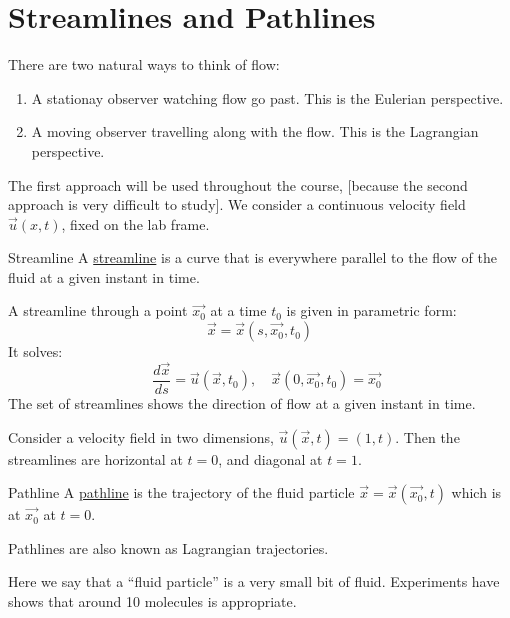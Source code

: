\documentclass[../Main.tex]{subfiles}
\begin{document}
\section{Streamlines and Pathlines}
There are two natural ways to think of flow:
\begin{enumerate}
    \item A stationay observer watching flow go past. This is the Eulerian perspective.
    \item A moving observer travelling along with the flow. This is the Lagrangian perspective.
\end{enumerate}
The first approach will be used throughout the course, [because the second approach is very difficult to study]. We consider a continuous velocity field $\vec{u}(x, t)$, fixed on the lab frame.
\begin{definition}{Streamline}
    A \underline{streamline} is a curve that is everywhere parallel to the flow of the fluid at a given instant in time.
\end{definition}
A streamline through a point $\vec{x_0}$ at a time $t_0$ is given in parametric form:
\begin{equation*}
    \vec{x} = \vec{x}(s, \vec{x_0}, t_0)
\end{equation*}
It solves:
\begin{equation*}
    \quad\frac{d\vec{x}}{ds} = \vec{u}(\vec{x}, t_0),\quad \vec{x}(0, \vec{x_0}, t_0) = \vec{x_0}
\end{equation*}
The set of streamlines shows the direction of flow at a given instant in time.
\begin{example}
    Consider a velocity field in two dimensions, $\vec{u}(\vec{x}, t) = (1, t)$. Then the streamlines are horizontal at $t = 0$, and diagonal at $t = 1$.
    \label{expStreamlines}
\end{example}
\begin{definition}{Pathline}
    A \underline{pathline} is the trajectory of the fluid particle $\vec{x} = \vec{x}(\vec{x_0}, t)$ which is at $\vec{x_0}$ at $t = 0$.

    Pathlines are also known as Lagrangian trajectories.
\end{definition}
Here we say that a ``fluid particle'' is a very small bit of fluid. Experiments have shows that around 10 molecules is appropriate.
\end{document}
